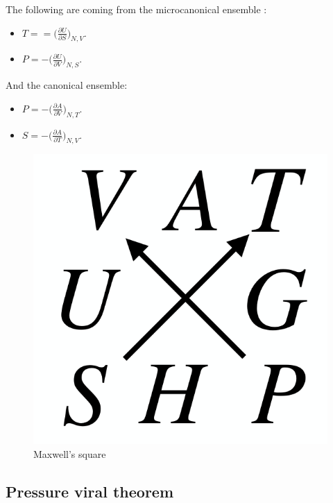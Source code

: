The following are coming from the microcanonical ensemble :
	\begin{multicols}{2}
		\begin{itemize}
			\item $T = =\biggl(\frac{\partial U}{\partial S}\biggr)_{N, V}$.
			\item $P = - \biggl(\frac{\partial U}{\partial V}\biggr)_{N, S}$.
		\end{itemize}
	\end{multicols}
	
And the canonical ensemble:
	\begin{multicols}{2}
		\begin{itemize}
			\item $P = -\biggl(\frac{\partial A}{\partial V}\biggr)_{N, T}$.
			\item $S = - \biggl(\frac{\partial A}{\partial T}\biggr)_{N, V}$.
		\end{itemize}
	\end{multicols}

	\begin{figure}[H]
		\includegraphics[scale = 0.1]{maxwell_square}
		\centering
		\caption{Maxwell's square}
	\end{figure}

	\subsection{Pressure viral theorem}

